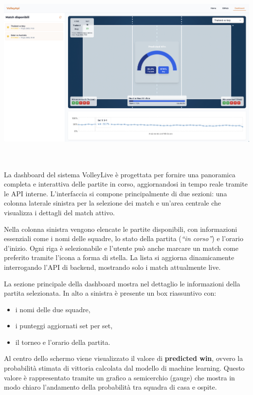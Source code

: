 \documentclass[a4paper,12pt]{report}
\begin{document}
\noindent\begin{minipage}{\textwidth}
  \centering
  \includegraphics[width=\textwidth]{dashboard.png}
  \label{fig:dashboard}
\end{minipage}

\\
\\
La dashboard del sistema VolleyLive è progettata per fornire una panoramica completa e interattiva delle partite in corso, aggiornandosi in tempo reale tramite le API interne. L’interfaccia si compone principalmente di due sezioni: una colonna laterale sinistra per la selezione dei match e un’area centrale che visualizza i dettagli del match attivo.

Nella colonna sinistra vengono elencate le partite disponibili, con informazioni essenziali come i nomi delle squadre, lo stato della partita (\textit{``in corso''}) e l’orario d’inizio. Ogni riga è selezionabile e l’utente può anche marcare un match come preferito tramite l’icona a forma di stella. La lista si aggiorna dinamicamente interrogando l’API di backend, mostrando solo i match attualmente live.

La sezione principale della dashboard mostra nel dettaglio le informazioni della partita selezionata. In alto a sinistra è presente un box riassuntivo con:
\begin{itemize}
  \item i nomi delle due squadre,
  \item i punteggi aggiornati set per set,
  \item il torneo e l’orario della partita.
\end{itemize}

Al centro dello schermo viene visualizzato il valore di \textbf{predicted win}, ovvero la probabilità stimata di vittoria calcolata dal modello di machine learning. Questo valore è rappresentato tramite un grafico a semicerchio (gauge) che mostra in modo chiaro l’andamento della probabilità tra squadra di casa e ospite.
\end{document}
